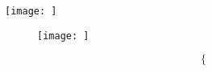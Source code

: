 \begin{center}
		\texttt{[image: ]}
\end{center}

\begin{figure}[htbp]
	\centering
	\caption*{}
	\texttt{[image: ]}
\end{figure}


\begin{equation}
	\begin{cases}
		\text{} \\
	\end{cases}
\end{equation}
